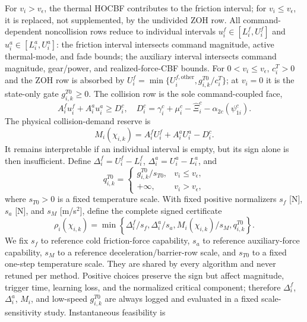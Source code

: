 For $v_i>v_\epsilon$, the thermal HOCBF contributes to the friction interval; for $v_i\le v_\epsilon$, it is replaced, not supplemented, by the undivided ZOH row. All command-dependent noncollision rows reduce to individual intervals $u_i^f\in[L_i^f,U_i^f]$ and $u_i^a\in[L_i^a,U_i^a]$: the friction interval intersects command magnitude, active thermal-mode, and fade bounds; the auxiliary interval intersects command magnitude, gear/power, and realized-force-CBF bounds. For $0<v_i\le v_\epsilon$, $c_i^T>0$ and the ZOH row is absorbed by $U_i^f=\min\{U_i^{f,\mathrm{other}},g_{i,k}^{T0}/c_i^T\}$; at $v_i=0$ it is the state-only gate $g_{i,k}^{T0}\ge0$. The collision row is the sole command-coupled face,
\begin{equation}\label{eq:collisiondemand}
A_i^fu_i^f+A_i^au_i^a\ge D_i^c,\quad
D_i^c=\gamma_i^c+\mu_i^c-\widehat\Xi_i^c-\alpha_{2c}(\psi_{1i}^c).
\end{equation}
The physical collision-demand reserve is
\begin{equation}\label{eq:reserve}
M_i(\chi_{i,k})=A_i^fU_i^f+A_i^aU_i^a-D_i^c.
\end{equation}
It remains interpretable if an individual interval is empty, but its sign alone is then insufficient. Define $\Delta_i^f=U_i^f-L_i^f$, $\Delta_i^a=U_i^a-L_i^a$, and
\begin{equation}
q_{i,k}^{T0}=\begin{cases}g_{i,k}^{T0}/s_{T0},&v_i\le v_\epsilon,\\+\infty,&v_i>v_\epsilon,\end{cases}
\end{equation}
where $s_{T0}>0$ is a fixed temperature scale. With fixed positive normalizers $s_f$ [N], $s_a$ [N], and $s_M$ [m/s$^2$], define the complete signed certificate
\begin{equation}\label{eq:rho}
\rho_i(\chi_{i,k})=\min\!\left\{\Delta_i^f/s_f,\Delta_i^a/s_a,M_i(\chi_{i,k})/s_M,q_{i,k}^{T0}\right\}.
\end{equation}
We fix $s_f$ to reference cold friction-force capability, $s_a$ to reference auxiliary-force capability, $s_M$ to a reference deceleration/barrier-row scale, and $s_{T0}$ to a fixed one-step temperature scale. They are shared by every algorithm and never retuned per method. Positive choices preserve the sign but affect magnitude, trigger time, learning loss, and the normalized critical component; therefore $\Delta_i^f$, $\Delta_i^a$, $M_i$, and low-speed $g_{i,k}^{T0}$ are always logged and evaluated in a fixed scale-sensitivity study. Instantaneous feasibility is
